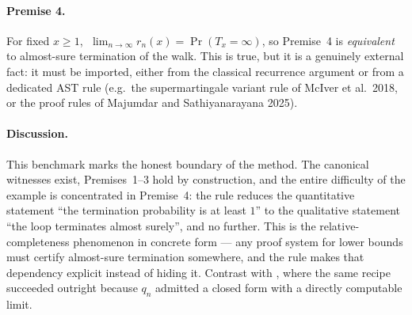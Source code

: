 \paragraph{Premise 4.}
For fixed $x \geq 1$, $\;\lim_{n\to\infty} r_n(x) = \Pr(T_x = \infty)$, so
Premise~4 is \emph{equivalent} to almost-sure termination of the walk. This
is true, but it is a genuinely external fact: it must be imported, either
from the classical recurrence argument or from a dedicated AST rule (e.g.\
the supermartingale variant rule of McIver et al.\ 2018, or the proof rules
of Majumdar and Sathiyanarayana 2025).

\paragraph{Discussion.}
This benchmark marks the honest boundary of the method. The canonical
witnesses exist, Premises~1--3 hold by construction, and the entire
difficulty of the example is concentrated in Premise~4: the rule reduces the
quantitative statement ``the termination probability is at least $1$'' to
the qualitative statement ``the loop terminates almost surely'', and no
further. This is the relative-completeness phenomenon in concrete form ---
any proof system for lower bounds must certify almost-sure termination
somewhere, and the rule makes that dependency explicit instead of hiding it.
Contrast with \Cref{app:bench-spline}, where the same recipe succeeded
outright because $q_n$ admitted a closed form with a directly computable
limit.
